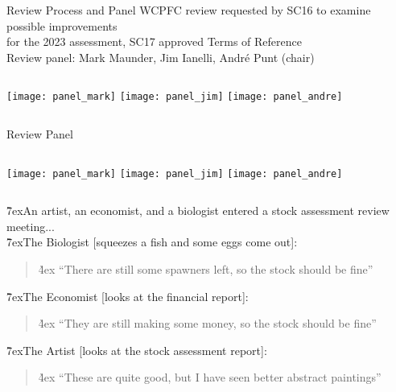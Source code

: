 \documentclass[aspectratio=169]{beamer}
\begin{document}

\begin{frame}{Review Process and Panel}\small
  WCPFC review requested by SC16 to examine possible improvements\\[0.2ex]
  for the 2023 assessment, SC17 approved Terms of Reference\\[4ex]
  Review panel: Mark Maunder, Jim Ianelli, André Punt (chair)\\[5ex]
  \begin{columns}
    \centering
    \texttt{[image: panel\_mark]}
    \centering
    \texttt{[image: panel\_jim]}
    \centering
    \texttt{[image: panel\_andre]}
  \end{columns}
  \vspace{6ex}
\end{frame}


\begin{frame}{Review Panel}\fns
  \vspace{2ex}
  \begin{columns}
    \texttt{[image: panel\_mark]}
    \texttt{[image: panel\_jim]}
    \texttt{[image: panel\_andre]}
  \end{columns}
  \vspace{3ex}
  \h{7ex}{\darkgreen An artist, an economist, and a biologist entered a stock
    assessment review meeting...}\\[2ex]
  \h{7ex}The Biologist [squeezes a fish and some eggs come out]:\\[-1ex]
  \begin{quote}\h{4ex}
    ``There are still some spawners left, so the stock should be fine''\\[3ex]
  \end{quote}
  \h{7ex}The Economist [looks at the financial report]:\\[-1ex]
  \begin{quote}\h{4ex}
    ``They are still making some money, so the stock should be fine''\\[3ex]
  \end{quote}
  \h{7ex}The Artist [looks at the stock assessment report]:\\[-1ex]
  \begin{quote}\h{4ex}
    ``These are quite good, but I have seen better abstract paintings''\\[3ex]
  \end{quote}
\end{frame}
\end{document}
